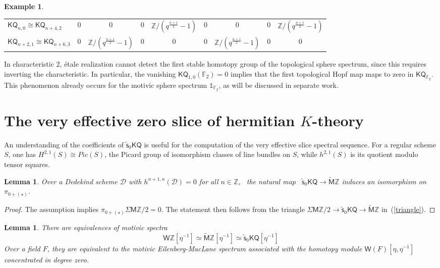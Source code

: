 \documentclass[11pt,hyp,english]{article}
\newcommand{\Z}{\mathbb{Z}}
\newcommand{\FF}{\mathbb{F}}
\newcommand{\unit}{\mathds{1}}
\newcommand{\KQ}{\mathsf{KQ}}
\newcommand{\MZ}{\mathsf{M}\Z}
\newcommand{\HZ}{\mathsf{M}\Z}
\newcommand{\cHZ}{\wt{{\mathsf{M}}}{\Z}}
\newcommand{\HWZ}{\mathsf{W}\Z}
\newcommand{\wt}[1]{\widetilde{#1}}
\newcommand{\vs}{\tilde{\mathsf{s}}}
\newcommand{\bideg}{(\star)}
\newtheorem{lemma}[theorem]{Lemma}
\theoremstyle{definition}
\newtheorem{example}[theorem]{Example}
\begin{document}
\begin{example}
\begin{center}
\begin{tabularx}{\textwidth}{l| c c c c c c c c}
\midrule
$\KQ_{n,0}\cong \KQ_{n+4,2}$ & $0$ & $0$ & $0$ &  $\Z/(q^{\frac{n+1}2}-1)$ & 0 & 0 & 0 & $\Z/(q^{\frac{n+1}2}-1)$\\
$\KQ_{n+2,1}\cong \KQ_{n+6,3}$ & $0$ &  $\Z/(q^{\frac{n+1}2}-1)$ & 0 & 0 & 0 & $\Z/(q^{\frac{n+1}2}-1)$ & $0$ & $0$ \\
\bottomrule
\end{tabularx}
\end{center}
In characteristic $2$, étale realization cannot detect the first stable homotopy group of the topological sphere spectrum, since this requires inverting the characteristic. 
In particular, the vanishing $\KQ_{1,0}(\FF_{2})=0$ implies that the first topological Hopf map maps to zero in $\KQ_{\FF_{2}}$. 
This phenomenon already occurs for the motivic sphere spectrum $\unit_{\FF_{2}}$, as will be discussed in separate work.
\end{example}





\section{The very effective zero slice of hermitian $K$-theory}
\label{section:tvezsokq}
 
An understanding of the coefficients of $\vs_{0}\KQ$ is useful for the computation of the very effective slice spectral sequence. For a regular scheme $S$, one has $H^{2,1}(S)\cong Pic(S)$, the Picard group of isomorphism classes of line bundles on $S$, while $h^{2,1}(S)$ is its quotient modulo tensor squares.

\begin{lemma}
\label{lem:pi0-v}
Over a Dedekind scheme $\mathcal{D}$ with $h^{n+1,n}(\mathcal{D})=0$ for all $n\in \Z$, 
 the natural map  $\vs_{0}\KQ \to \cHZ$ induces an isomorphism on $\pi_{0+\bideg}$.
\end{lemma}
\begin{proof}
The assumption implies $\pi_{0+\bideg}\Sigma \MZ/2=0$. 
The statement then follows from the triangle 
$\Sigma \MZ/2\to \vs_{0}\KQ \to \cHZ$ in~(\ref{triangle}).
\end{proof}



\begin{lemma}
\label{lem:etainv-v}
There are equivalences of motivic spectra 
\[
\HWZ[\eta^{-1}] \simeq \cHZ[\eta^{-1}]\simeq\vs_{0}\KQ [\eta^{-1}]
\] 
Over a field $F$, they are equivalent to the motivic Eilenberg-MacLane spectrum associated with the homotopy module $\mathsf{W}(F)[\eta,\eta^{-1}]$ concentrated in degree zero.
\end{lemma}
\end{document}

